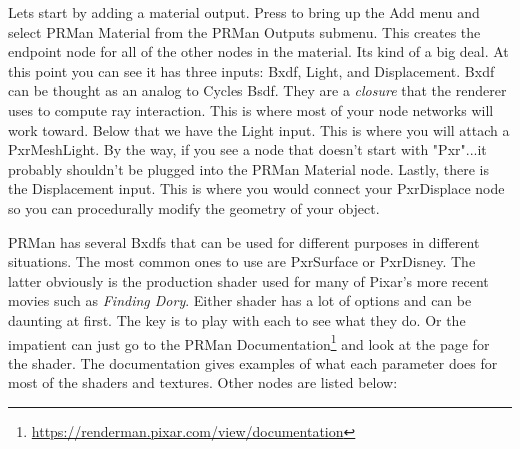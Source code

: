 Lets start by adding a material output.  Press  to bring up the \textsf{Add} menu and select \textsf{PRMan Material} from the \textsf{PRMan Outputs} submenu.  This creates the endpoint node for all of the other nodes in the material.  Its kind of a big deal.  At this point you can see it has three inputs:  \textsf{Bxdf}, \textsf{Light}, and \textsf{Displacement}.  \textsf{Bxdf} can be thought as an analog to Cycles \textsf{Bsdf}.  They are a \emph{closure} that the renderer uses to compute ray interaction.  This is where most of your node networks will work toward.  Below that we have the \textsf{Light} input.  This is where you will attach a \textsf{PxrMeshLight}.  By the way, if you see a node that doesn't start with "Pxr"...it probably shouldn't be plugged into the \textsf{PRMan Material} node.  Lastly, there is the \textsf{Displacement} input.  This is where you would connect your \textsf{PxrDisplace} node so you can procedurally modify the geometry of your object. 

PRMan has several Bxdfs that can be used for different purposes in different situations.  The most common ones to use are \textsf{PxrSurface} or \textsf{PxrDisney}.  The latter obviously is the production shader used for many of Pixar's more recent movies such as \textsl{Finding Dory}. Either shader has a lot of options and can be daunting at first.  The key is to play with each to see what they do.  Or the impatient can just go to the PRMan Documentation\footnote{\url{https://renderman.pixar.com/view/documentation}} and look at the page for the shader.  The documentation gives examples of what each parameter does for most of the shaders and textures.  Other nodes are listed below:

